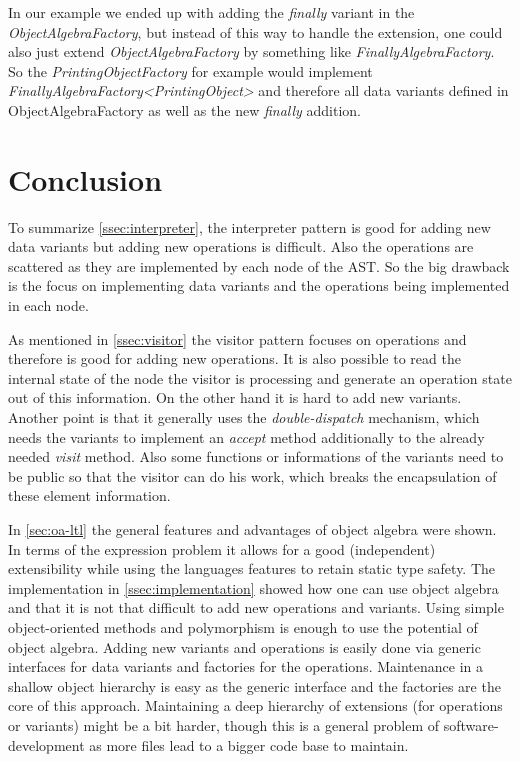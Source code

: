 \documentclass{llncs}
\begin{document}
In our example we ended up with adding the \emph{finally} variant in the \emph{ObjectAlgebraFactory}, but instead of this way to handle the extension, one could also just extend \emph{ObjectAlgebraFactory} by something like \emph{FinallyAlgebraFactory}. So the \emph{PrintingObjectFactory} for example would implement \emph{FinallyAlgebraFactory\textless PrintingObject\textgreater} and therefore all data variants defined in ObjectAlgebraFactory as well as the new \emph{finally} addition.

\section{Conclusion} \label{sec:conclusion}
To summarize \autoref{ssec:interpreter}, the interpreter pattern is good for adding new data variants but adding new operations is difficult. Also the operations are scattered as they are implemented by each node of the AST. So the big drawback is the focus on implementing data variants and the operations being implemented in each node.

As mentioned in \autoref{ssec:visitor} the visitor pattern focuses on operations and therefore is good for adding new operations. It is also possible to read the internal state of the node the visitor is processing and generate an operation state out of this information. On the other hand it is hard to add new variants. Another point is that it generally uses the \emph{double-dispatch} mechanism, which needs the variants to implement an \emph{accept} method additionally to the already needed \emph{visit} method. Also some functions or informations of the variants need to be public so that the visitor can do his work, which breaks the encapsulation of these element information.

In \autoref{sec:oa-ltl} the general features and advantages of object algebra were shown. In terms of the expression problem it allows for a good (independent) extensibility while using the languages features to retain static type safety. The implementation in \autoref{ssec:implementation} showed how one can use object algebra and that it is not that difficult to add new operations and variants. Using simple object-oriented methods and polymorphism is enough to use the potential of object algebra. Adding new variants and operations is easily done via generic interfaces for data variants and factories for the operations. Maintenance in a shallow object hierarchy is easy as the generic interface and the factories are the core of this approach. Maintaining a deep hierarchy of extensions (for operations or variants) might be a bit harder, though this is a general problem of software-development as more files lead to a bigger code base to maintain. 
\end{document}
